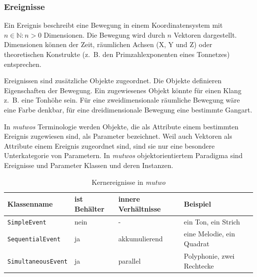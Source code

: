 \documentclass[12pt,a4paper,ngerman]{article}
\begin{document}
\subsubsection{Ereignisse}
\label{eventDefinitions}

Ein Ereignis beschreibt eine Bewegung in einem Koordinatensystem mit $n\in\mathbb{N}:n>0$ Dimensionen.
Die Bewegung wird durch $n$ Vektoren dargestellt.
Dimensionen können der Zeit, räumlichen Achsen (X, Y und Z) oder theoretischen Konstrukte (z.~B. den Primzahlexponenten eines Tonnetzes) entsprechen.

\bigskip

Ereignissen sind zusätzliche Objekte zugeordnet.
Die Objekte definieren Eigenschaften der Bewegung.
Ein zugewiesenes Objekt könnte für einen Klang z.~B. eine Tonhöhe sein.
Für eine zweidimensionale räumliche Bewegung wäre eine Farbe denkbar, für eine dreidimensionale Bewegung eine bestimmte Gangart.

\bigskip

In \emph{mutwos} Terminologie werden Objekte, die als Attribute einem bestimmten Ereignis zugewiesen sind, als Parameter bezeichnet.
Weil auch Vektoren als Attribute einem Ereignis zugeordnet sind, sind sie nur eine besondere Unterkategorie von Parametern.
In \emph{mutwos} objektorientiertem Paradigma sind Ereignisse und Parameter Klassen und deren Instanzen.

\bigskip


% 

\begin{table}[h!]
    \begin{center}
        \begin{tabular}{l l l l} 
            \hline
            Klassenname & ist Behälter & innere Verhältnisse & Beispiel \\ [0.5ex] 
            \hline\hline
            \texttt{SimpleEvent} & nein & - & ein Ton, ein Strich \\ 
            \texttt{SequentialEvent} & ja & akkumulierend & eine Melodie, ein Quadrat \\ 
            \texttt{SimultaneousEvent} & ja & parallel & Polyphonie, zwei Rechtecke \\ [1ex] 
            \hline
        \end{tabular}
    \end{center}

    \caption{Kernereignisse in \emph{mutwo}}
\end{table}
\end{document}
